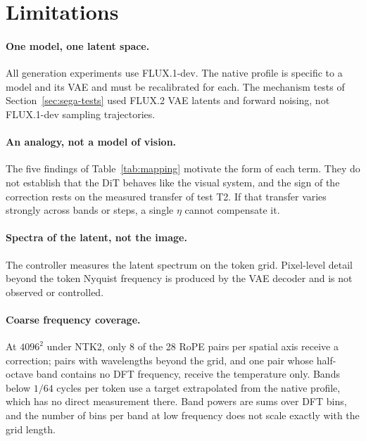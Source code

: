 \section{Limitations}
\label{sec:limitations}


\paragraph{One model, one latent space.}
All generation experiments use FLUX.1-dev. The native profile is specific to a model and its VAE and must be recalibrated for each. The mechanism tests of Section~\ref{sec:sega-tests} used FLUX.2 VAE latents and forward noising, not FLUX.1-dev sampling trajectories. 

\paragraph{An analogy, not a model of vision.}
The five findings of Table~\ref{tab:mapping} motivate the form of each term. They do not establish that the DiT behaves like the visual system, and the sign of the correction rests on the measured transfer of test T2. If that transfer varies strongly across bands or steps, a single $\eta$ cannot compensate it.

\paragraph{Spectra of the latent, not the image.}
The controller measures the latent spectrum on the token grid. Pixel-level detail beyond the token Nyquist frequency is produced by the VAE decoder and is not observed or controlled.

\paragraph{Coarse frequency coverage.}
At $4096^2$ under NTK2, only 8 of the 28 RoPE pairs per spatial axis receive a correction; pairs with wavelengths beyond the grid, and one pair whose half-octave band contains no DFT frequency, receive the temperature only. Bands below $1/64$ cycles per token use a target extrapolated from the native profile, which has no direct measurement there. Band powers are sums over DFT bins, and the number of bins per band at low frequency does not scale exactly with the grid length.

